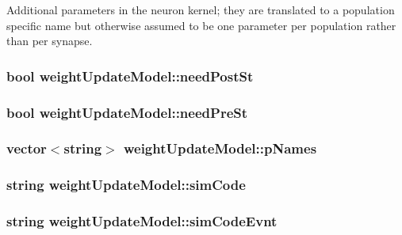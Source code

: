 Additional parameters in the neuron kernel; they are translated to a population specific name but otherwise assumed to be one parameter per population rather than per synapse. 

\hypertarget{classweightUpdateModel_a1948fc8aa7b2d8b82784cbd09bc741aa}{
\subsubsection[{need\+Post\+St}]{\setlength{\rightskip}{0pt plus 5cm}bool weight\+Update\+Model\+::need\+Post\+St}}\label{classweightUpdateModel_a1948fc8aa7b2d8b82784cbd09bc741aa}
\hypertarget{classweightUpdateModel_af93f31710e2249afd22c05c4a7e7a28d}{
\subsubsection[{need\+Pre\+St}]{\setlength{\rightskip}{0pt plus 5cm}bool weight\+Update\+Model\+::need\+Pre\+St}}\label{classweightUpdateModel_af93f31710e2249afd22c05c4a7e7a28d}
\hypertarget{classweightUpdateModel_a991eb286139c935b39e0af71e5b85ec6}{
\subsubsection[{p\+Names}]{\setlength{\rightskip}{0pt plus 5cm}vector$<$string$>$ weight\+Update\+Model\+::p\+Names}}\label{classweightUpdateModel_a991eb286139c935b39e0af71e5b85ec6}
\hypertarget{classweightUpdateModel_a6f665453175451356bbf14b9f60baed3}{
\subsubsection[{sim\+Code}]{\setlength{\rightskip}{0pt plus 5cm}string weight\+Update\+Model\+::sim\+Code}}\label{classweightUpdateModel_a6f665453175451356bbf14b9f60baed3}
\hypertarget{classweightUpdateModel_a758cc3211ae12407583f625418dd5a89}{
\subsubsection[{sim\+Code\+Evnt}]{\setlength{\rightskip}{0pt plus 5cm}string weight\+Update\+Model\+::sim\+Code\+Evnt}}\label{classweightUpdateModel_a758cc3211ae12407583f625418dd5a89}
